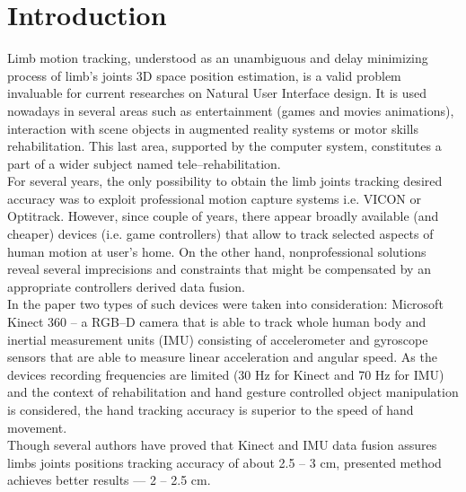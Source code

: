 \documentclass[9pt]{llncs}
\begin{document}
\section{Introduction}
\label{sec:introduction}
Limb motion tracking, understood as an unambiguous and delay minimizing process of limb's joints 3D space position estimation, is a valid problem invaluable for current researches on Natural User Interface design. It is used nowadays in several areas such as entertainment (games and movies animations), interaction with scene objects in augmented reality systems or motor skills rehabilitation. This last area, supported by the computer system, constitutes a part of a wider subject named tele--rehabilitation.\\
For several years, the only possibility to obtain the limb joints tracking desired accuracy was to exploit professional motion capture systems i.e. VICON or Optitrack. However, since couple of years, there appear broadly available (and cheaper) devices (i.e. game controllers) that allow to track selected aspects of human motion at user's home. On the other hand, nonprofessional solutions reveal several imprecisions and constraints that might be compensated by an appropriate controllers derived data fusion.\\
In the paper two types of such devices were taken into consideration: Microsoft  Kinect 360 -- a RGB--D camera that is able to track whole human body and inertial measurement units (IMU) consisting of accelerometer and gyroscope sensors that are able to measure linear acceleration and angular speed. As the devices recording frequencies are limited (30 Hz for Kinect and 70 Hz for IMU) and the context of rehabilitation and hand gesture controlled object manipulation is considered, the hand tracking accuracy is superior to the speed of hand movement.\\
Though several authors \cite{Bo2011,Destelle2014,Murray-Smith2014} have proved that Kinect and IMU data fusion assures limbs joints positions tracking accuracy of about 2.5 -- 3 cm, presented method achieves better results --- 2 -- 2.5 cm.
\end{document}
